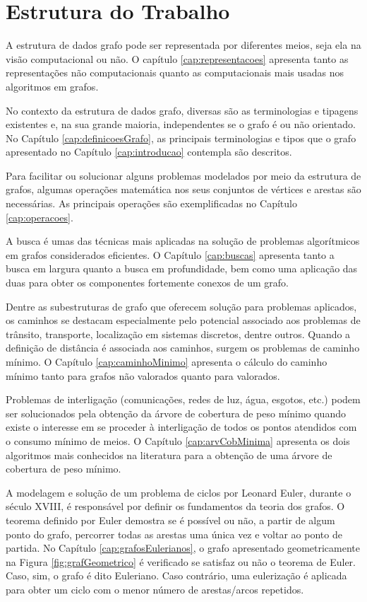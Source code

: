\documentclass[
12pt,
a4paper,
semrecuonosumario,
sumario = abnt-6027-2012]{report}
\begin{document}
	\section{Estrutura do Trabalho}\label{sec:estruturaTrabalho}
	A estrutura de dados grafo pode ser representada por diferentes meios, seja ela na visão computacional ou não. O capítulo \ref{cap:representacoes} apresenta tanto as representações não computacionais quanto as computacionais mais usadas nos algoritmos em grafos.

	No contexto da estrutura de dados grafo, diversas são as terminologias e tipagens existentes e, na sua grande maioria, independentes se o grafo é ou não orientado. No Capítulo \ref{cap:definicoesGrafo}, as principais terminologias e tipos que o grafo apresentado no Capítulo \ref{cap:introducao} contempla são descritos.

	Para facilitar ou solucionar alguns problemas modelados por meio da estrutura de grafos,  algumas operações matemática nos seus conjuntos de vértices e arestas são necessárias. As principais operações são exemplificadas no Capítulo \ref{cap:operacoes}.

	A busca é umas das técnicas mais aplicadas na solução de problemas algorítmicos em grafos considerados eficientes. O Capítulo \ref{cap:buscas} apresenta tanto a busca em largura quanto a busca em profundidade, bem como uma aplicação das duas para obter os componentes fortemente conexos de um grafo.

	Dentre as subestruturas de grafo que oferecem solução para problemas aplicados, os caminhos se destacam especialmente pelo potencial associado aos problemas de trânsito, transporte, localização em sistemas discretos, dentre outros. Quando a definição de distância é associada aos caminhos, surgem os problemas de caminho mínimo. O Capítulo \ref{cap:caminhoMinimo} apresenta o cálculo do caminho mínimo tanto para grafos não valorados quanto para valorados.

	Problemas de interligação (comunicações, redes de luz, água, esgotos, etc.) podem ser solucionados pela obtenção da árvore de cobertura de peso mínimo quando existe o interesse em se proceder à interligação de todos os pontos atendidos com o consumo mínimo de meios. O Capítulo \ref{cap:arvCobMinima} apresenta os dois algoritmos mais conhecidos na literatura para a obtenção de uma árvore de cobertura de peso mínimo.

	A modelagem e solução de um problema de ciclos por Leonard Euler, durante o século XVIII, é responsável por definir os fundamentos da teoria dos grafos. O teorema definido por Euler demostra se é possível ou não, a partir de algum ponto do grafo, percorrer todas as arestas uma única vez e voltar ao ponto de partida. No Capítulo \ref{cap:grafosEulerianos}, o grafo apresentado geometricamente na Figura \ref{fig:grafGeometrico} é verificado se satisfaz ou não o teorema de Euler. Caso, sim, o grafo é dito Euleriano. Caso contrário, uma eulerização é aplicada para obter um ciclo com o menor número de arestas/arcos repetidos.
\end{document}
